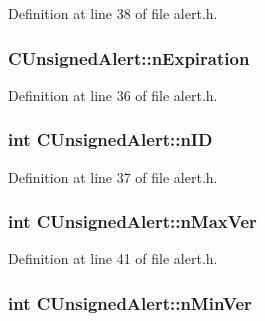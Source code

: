 Definition at line 38 of file alert.\+h.

\hypertarget{class_c_unsigned_alert_af77a9d4d3abc0a0b376a7689059620e8}{}
\subsubsection[{n\+Expiration}]{ C\+Unsigned\+Alert\+::n\+Expiration}\label{class_c_unsigned_alert_af77a9d4d3abc0a0b376a7689059620e8}


Definition at line 36 of file alert.\+h.

\hypertarget{class_c_unsigned_alert_a4e11dc713526f6597a20762e707518a0}{}
\subsubsection[{n\+I\+D}]{\setlength{\rightskip}{0pt plus 5cm}int C\+Unsigned\+Alert\+::n\+I\+D}\label{class_c_unsigned_alert_a4e11dc713526f6597a20762e707518a0}


Definition at line 37 of file alert.\+h.

\hypertarget{class_c_unsigned_alert_a041bff847e178c132cb4d5234c1f41c8}{}
\subsubsection[{n\+Max\+Ver}]{\setlength{\rightskip}{0pt plus 5cm}int C\+Unsigned\+Alert\+::n\+Max\+Ver}\label{class_c_unsigned_alert_a041bff847e178c132cb4d5234c1f41c8}


Definition at line 41 of file alert.\+h.

\hypertarget{class_c_unsigned_alert_af7ab540ea7df8e97fbfba7551ec31b1a}{}
\subsubsection[{n\+Min\+Ver}]{\setlength{\rightskip}{0pt plus 5cm}int C\+Unsigned\+Alert\+::n\+Min\+Ver}\label{class_c_unsigned_alert_af7ab540ea7df8e97fbfba7551ec31b1a}


